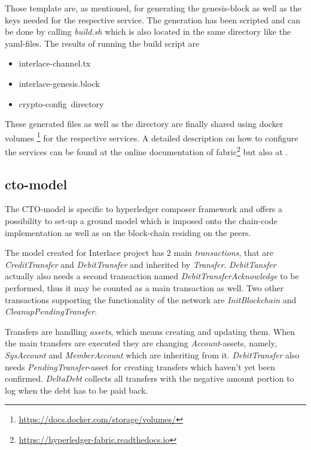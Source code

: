 Those template are, as mentioned, for generating the genesis-block as well as the keys needed for the respective service. The generation has been scripted and can be done by calling \textit{build.sh} which is also located in the same directory like the yaml-files. The results of running the build script are

\begin{itemize}
	\item interlace-channel.tx
	\item interlace-genesis.block
	\item crypto-config\ directory
\end{itemize}

These generated files as well as the directory are finally shared using docker volumes \footnote{\url{https://docs.docker.com/storage/volumes/}} for the respective services. A detailed description on how to configure the services can be found at the online documentation of fabric\footnote{\url{https://hyperledger-fabric.readthedocs.io}} but also at \cite{HandsOnBlockchainHyperledger2018}.

\subsection{cto-model}

The CTO-model is specific to hyperledger composer framework and offers a possibility to set-up a ground model which is imposed onto the chain-code implementation as well as on the block-chain residing on the peers. 

The model created for Interlace project has 2 main \textit{transactions}, that are \textit{CreditTransfer} and \textit{DebitTransfer} and inherited by \textit{Transfer}. \textit{DebitTansfer} actually also needs a second transaction named \textit{DebitTransferAcknowledge} to be performed, thus it may be counted as a main transaction as well. Two other transactions supporting the functionality of the network are \textit{InitBlockchain} and \textit{CleanupPendingTransfer}.

Transfers are handling \textit{assets}, which means creating and updating them. When the main transfers are executed they are changing \textit{Account}-assets, namely, \textit{SysAccount} and \textit{MemberAccount} which are inheriting from it. \textit{DebitTransfer} also needs \textit{PendingTransfer}-asset for creating transfers which haven't yet been confirmed. \textit{DeltaDebt} collects all transfers with the negative amount portion to log when the debt has to be paid back.

